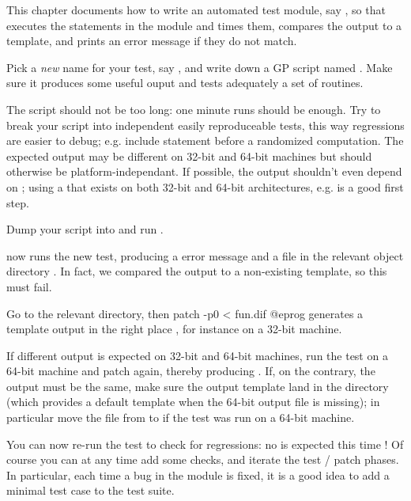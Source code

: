 This chapter documents how to write an automated test module, say , so
that  executes the statements in the  module
and times them, compares the output to a template, and prints an error message
if they do not match.

\item Pick a \emph{new} name for your test, say , and write down a
GP script named . Make sure it produces some useful ouput and tests
adequately a set of routines.

\item The script should not be too long: one minute runs should be enough.
Try to break your script into independent easily reproduceable tests, this way
regressions are easier to debug; e.g. include  statement before
a randomized computation. The expected output may be different on 32-bit and
64-bit machines but should otherwise be platform-independant. If possible, the
output shouldn't even depend on ; using a 
that exists on both 32-bit and 64-bit architectures, e.g.  is a
good first step.

\item Dump your script into  and run .

\item {} now runs the new test, producing a \kbd{[BUG]} error
message and a  file in the relevant object directory .
In fact, we compared the output to a non-existing template, so this must fail.

\item Go to the relevant  directory, then
\bprog
  patch -p0 < fun.dif
@eprog\noindent
generates a template output in the right place , for
instance on a 32-bit machine.

\item If different output is expected on 32-bit and 64-bit machines, run the
test on a 64-bit machine and patch again, thereby
producing . If, on the contrary, the output must be the
same, make sure the output template land in the  directory
(which provides a default template when the 64-bit output file is missing);
in particular move the file from  to 
if the test was run on a 64-bit machine.

\item You can now re-run the test to check for regressions: no \kbd{[BUG]}
is expected this time ! Of course you can at any time add some checks, and
iterate the test / patch phases. In particular, each time a bug in the
 module is fixed, it is a good idea to add a minimal test case to
the test suite.

